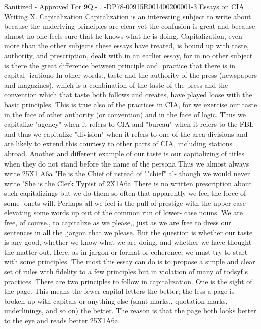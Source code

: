\documentclass[
    oneside,
    11pt,
    draft
]{memoir}
\begin{document}
Sanitized - Approved For 9Q.- . -DP78-00915R001400200001-3 Essays on CIA Writing X. Capitalization Capitalization is an interesting subject to write about because the underlying principles are clear yet the confusion is great and because almost no one feels sure that he knows what he is doing. Capitalization, even more than the other subjects these essays have treated, is bound up with taste, authority, and prescription, dealt with in an earlier essay, for in no other subject is there the great difference between principle and. practice that there is in capital- izationo In other words., taste and the authority of the press (newspapers and magazines), which is a combination of the taste of the press and the convention which that taste both follows and creates, have played loose with the basic principles. This is true also of the practices in CIA, for we exercise our taste in the face of other authority (or convention) and in the face of logic. Thus we capitalize "agency" when it refers to CIA and "bureau" when it refers to the FBI, and thus we capitalize "division" when it refers to one of the area divisions and are likely to extend this courtesy to other parts of CIA, including stations abroad. Another and different example of our taste is our capitalizing of titles when they do not stand before the name of the persona Thus we almost always write 25X1 A6a "He is the Chief of nstead of ""chief" al- though we would never write "She is the Clerk Typist of 2X1A6a There is no written prescription about such capitalizings but we do them so often that apparently we feel the force of some- onets will. Perhaps all we feel is the pull of prestige with the upper case elevating some words up out of the common run of lower- case nouns. We are free, of course., to capitalize as we please,, just as we are free to dress our sentences in all the ,jargon that we please. But the question is whether our taste is any good, whether we know what we are doing, and whether we have thought the matter out. Here, as in jargon or format or coherence, we must try to start with some principles. The most this essay can do is to propose a simple and clear set of rules with fidelity to a few principles but in violation of many of todsyf s practices. There are two principles to follow in capitalization. One is the sight of the page. This means the fewer capital letters the better; the less a page is broken up with capitals or anything else (slant marks., quotation marks, underlinings, and so on) the better. The reason is that the page both looks better to the eye and reads better 25X1A6a
\end{document}
